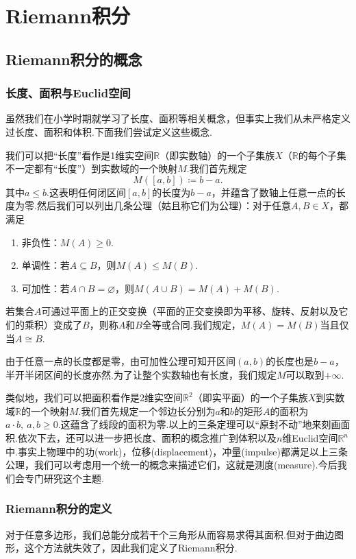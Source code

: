 \chapter{Riemann积分}
\section{Riemann积分的概念}
\subsection{长度、面积与Euclid空间}
虽然我们在小学时期就学习了长度、面积等相关概念，但事实上我们从未严格定义过长度、面积和体积.下面我们尝试定义这些概念.

我们可以把“长度”看作是1维实空间$\mathbb{R}$（即实数轴）的一个子集族$X$（$\mathbb{R}$的每个子集不一定都有“长度”）到实数域的一个映射$M$.我们首先规定
$$M(\left[a,b\right])\coloneqq b-a.$$
其中$a\leqslant b$.这表明任何闭区间$\left[a,b\right]$的长度为$b-a$，并蕴含了数轴上任意一点的长度为零.然后我们可以列出几条公理（姑且称它们为公理）：对于任意$A,B\in X$，都满足
\begin{enumerate}
	\item 非负性：$M(A)\geqslant 0$.
	\item 单调性：若$A\subseteq B$，则$M(A)\leqslant M(B)$.
	\item 可加性：若$A\cap B=\varnothing$，则$M(A\cup B)=M(A)+M(B)$.
\end{enumerate}
若集合$A$可通过平面上的正交变换（平面的正交变换即为平移、旋转、反射以及它们的乘积）变成了$B$，则称$A$和$B${\heiti 全等}或{\heiti 合同}.我们规定，$M(A)=M(B)$当且仅当$A\cong B$.

由于任意一点的长度都是零，由可加性公理可知开区间$(a,b)$的长度也是$b-a$，半开半闭区间的长度亦然.为了让整个实数轴也有长度，我们规定$M$可以取到$+\infty$.

类似地，我们可以把面积看作是2维实空间$\mathbb{R}^2$（即实平面）的一个子集族$X$到实数域$\mathbb{R}$的一个映射$M$.我们首先规定一个邻边长分别为$a$和$b$的矩形$A$的面积为$a\cdot b,\ a,b\geqslant 0$.这蕴含了线段的面积为零.以上的三条定理可以“原封不动”地来刻画面积.依次下去，还可以进一步把长度、面积的概念推广到体积以及$n$维Euclid空间$\mathbb{R}^n$中.事实上物理中的{\heiti 功}(work)，{\heiti 位移}(displacement)，{\heiti 冲量}(impulse)都满足以上三条公理，我们可以考虑用一个统一的概念来描述它们，这就是{\heiti 测度}(measure).今后我们会专门研究这个主题.
\subsection{Riemann积分的定义}
对于任意多边形，我们总能分成若干个三角形从而容易求得其面积.但对于曲边图形，这个方法就失效了，因此我们定义了Riemann积分.

